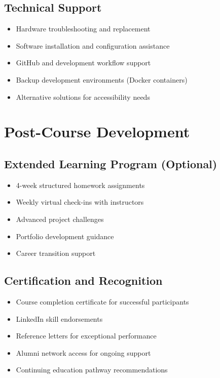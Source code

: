 \documentclass[11pt,a4paper]{article}
\begin{document}
\subsection{Technical Support}
\begin{itemize}
    \item Hardware troubleshooting and replacement
    \item Software installation and configuration assistance
    \item GitHub and development workflow support
    \item Backup development environments (Docker containers)
    \item Alternative solutions for accessibility needs
\end{itemize}

\section{Post-Course Development}

\subsection{Extended Learning Program (Optional)}
\begin{itemize}
    \item 4-week structured homework assignments
    \item Weekly virtual check-ins with instructors
    \item Advanced project challenges
    \item Portfolio development guidance
    \item Career transition support
\end{itemize}

\subsection{Certification and Recognition}
\begin{itemize}
    \item Course completion certificate for successful participants
    \item LinkedIn skill endorsements
    \item Reference letters for exceptional performance
    \item Alumni network access for ongoing support
    \item Continuing education pathway recommendations
\end{itemize}
\end{document}
